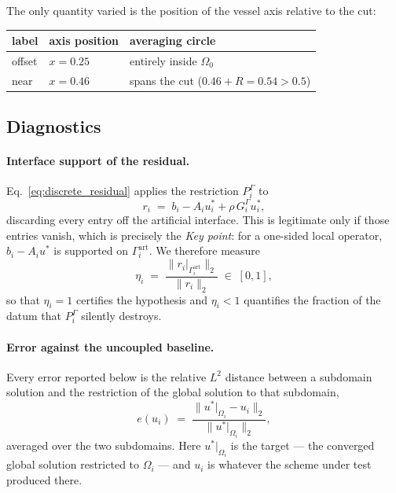 The only quantity varied is the position of the vessel axis relative to the cut:

\begin{center}
\begin{tabular}{lll}
\toprule
label & axis position & averaging circle \\
\midrule
\textsf{offset} & $x = 0.25$ & entirely inside $\Omega_0$ \\
\textsf{near}   & $x = 0.46$ & spans the cut ($0.46 + R = 0.54 > 0.5$) \\
\bottomrule
\end{tabular}
\end{center}

\subsection{Diagnostics}

\paragraph{Interface support of the residual.}
Eq.~\eqref{eq:discrete_residual} applies the restriction $P_i^\Gamma$ to
\begin{equation}
  r_i \;=\; b_i - A_i u^*_i + \rho\, G_i^\Gamma u^*_i ,
  \label{eq:residual}
\end{equation}
discarding every entry off the artificial interface. This is legitimate only if
those entries vanish, which is precisely the \emph{Key point}: for a one-sided
local operator, $b_i - A_i u^*$ is supported on $\Gamma_i^{\mathrm{art}}$. We
therefore measure
\begin{equation}
  \eta_i \;=\;
  \frac{\bigl\| r_i|_{\Gamma_i^{\mathrm{art}}} \bigr\|_2}{\|r_i\|_2}
  \;\in\; [0,1],
  \label{eq:eta}
\end{equation}
so that $\eta_i = 1$ certifies the hypothesis and $\eta_i < 1$ quantifies the
fraction of the datum that $P_i^\Gamma$ silently destroys.

\paragraph{Error against the uncoupled baseline.}
Every error reported below is the relative $L^2$ distance between a subdomain
solution and the restriction of the global solution to that subdomain,
\begin{equation}
  e(u_i) \;=\;
  \frac{\bigl\| u^*|_{\Omega_i} - u_i \bigr\|_2}
       {\bigl\| u^*|_{\Omega_i} \bigr\|_2},
  \label{eq:relerr}
\end{equation}
averaged over the two subdomains. Here $u^*|_{\Omega_i}$ is the target --- the
converged global solution restricted to $\Omega_i$ --- and $u_i$ is whatever the
scheme under test produced there.

